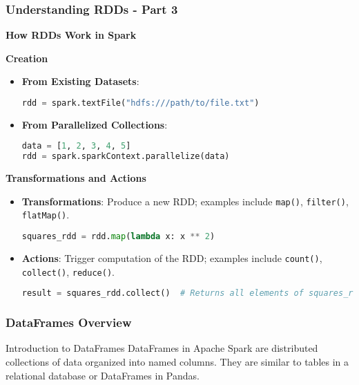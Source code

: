 \documentclass{beamer}
\begin{document}
\begin{frame}[fragile]
    \frametitle{Understanding RDDs - Part 3}

    \textbf{How RDDs Work in Spark}
    
    \textbf{Creation}
    \begin{itemize}
        \item \textbf{From Existing Datasets}:
        \begin{lstlisting}[language=Python]
rdd = spark.textFile("hdfs:///path/to/file.txt")
        \end{lstlisting}
        
        \item \textbf{From Parallelized Collections}:
        \begin{lstlisting}[language=Python]
data = [1, 2, 3, 4, 5]
rdd = spark.sparkContext.parallelize(data)
        \end{lstlisting}
    \end{itemize}

    \textbf{Transformations and Actions}
    \begin{itemize}
        \item \textbf{Transformations}: Produce a new RDD; examples include \texttt{map()}, \texttt{filter()}, \texttt{flatMap()}.
        \begin{lstlisting}[language=Python]
squares_rdd = rdd.map(lambda x: x ** 2)
        \end{lstlisting}

        \item \textbf{Actions}: Trigger computation of the RDD; examples include \texttt{count()}, \texttt{collect()}, \texttt{reduce()}.
        \begin{lstlisting}[language=Python]
result = squares_rdd.collect()  # Returns all elements of squares_rdd as a list
        \end{lstlisting}
    \end{itemize}
\end{frame}

\begin{frame}[fragile]
    \frametitle{DataFrames Overview}
    \begin{block}{Introduction to DataFrames}
        DataFrames in Apache Spark are distributed collections of data organized into named columns.
        They are similar to tables in a relational database or DataFrames in Pandas.
    \end{block}
\end{frame}
\end{document}
